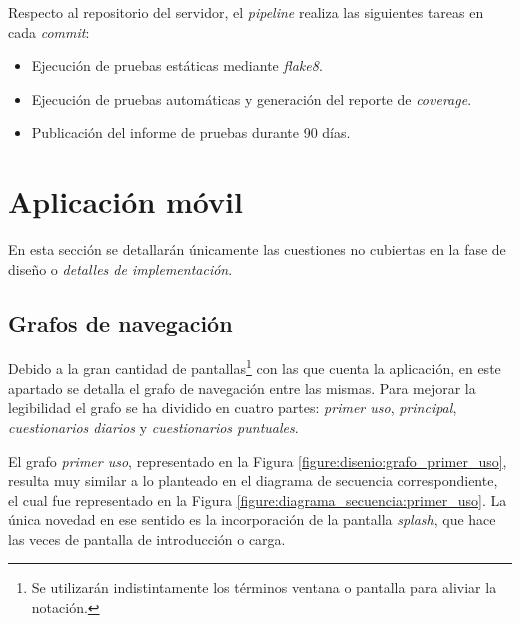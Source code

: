         Respecto al repositorio del servidor, el \textit{pipeline} realiza las siguientes tareas en cada \textit{commit}:
        \begin{itemize}
            \item Ejecución de pruebas estáticas mediante \textit{flake8}.
            \item Ejecución de pruebas automáticas y generación del reporte de \textit{coverage}.
            \item Publicación del informe de pruebas durante 90 días.
        \end{itemize}
        
    
    \section{Aplicación móvil}
    
        En esta sección se detallarán únicamente las cuestiones no cubiertas en la fase de diseño o \textit{detalles de implementación}.
        
        \subsection{Grafos de navegación}
            Debido a la gran cantidad de pantallas\footnote{Se utilizarán indistintamente los términos ventana o pantalla para aliviar la notación.} con las que cuenta la aplicación, en este apartado se detalla el grafo de navegación entre las mismas. Para mejorar la legibilidad el grafo se ha dividido en cuatro partes: \textit{primer uso}, \textit{principal}, \textit{cuestionarios diarios} y \textit{cuestionarios puntuales}.

            El grafo \textit{primer uso}, representado en la Figura \ref{figure:disenio:grafo_primer_uso}, resulta muy similar a lo planteado en el diagrama de secuencia correspondiente, el cual fue representado en la Figura \ref{figure:diagrama_secuencia:primer_uso}. La única novedad en ese sentido es la incorporación de la pantalla \textit{splash}, que hace las veces de pantalla de introducción o carga.
            
